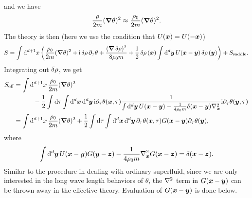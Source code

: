 \documentclass[hyperref, a4paper]{article}
\newcommand*{\ii}{\mathrm{i}}
\begin{document}
\begin{itemize}
and we have 
\[
    \frac{\rho}{2m} (\grad{\theta})^2 \approx \frac{\rho_0}{2m} (\grad{\theta})^2.
\]
The theory is then (here we use the condition that $U(\vb*{x}) = U(- \vb*{x})$)
\begin{equation}
    S = \int \dd[d+1]{x} \left(
        \frac{\rho_0}{2m} (\grad{\theta})^2 
        + \ii \var{\rho} \partial_\tau \theta  
        + \frac{(\grad{\var{\rho}})^2}{8 \rho_0 m} 
        + \frac{1}{2} \var{\rho}(\vb*{x}) \int \dd[d]{\vb*{y}} U(\vb*{x} - \vb*{y}) \var{\rho}(\vb*{y})
    \right) + S_{\text{saddle}}.
\end{equation}
Integrating out $\var{\rho}$, we get 
\begin{equation}
    \begin{aligned}
        S_{\text{eff}} &= \int \dd[d+1]{x} \frac{\rho_0}{2m} (\grad{\theta})^2  \\
        &\quad \quad \quad - \frac{1}{2} \int \dd{\tau} \int \dd[d]{\vb*{x}} \dd[d]{\vb*{y}} 
        \ii \partial_\tau \theta(\vb*{x}, \tau)
            \frac{1}{
                \int \dd[d]{\vb*{y}} U(\vb*{x} - \vb*{y}) 
                - \frac{1}{4 \rho_0 m} \delta(\vb*{x} - \vb*{y}) \laplacian_{\vb*{x}}
            } \ii \partial_\tau \theta (\vb*{y}, \tau) \\
        &= \int \dd[d+1]{x} \frac{\rho_0}{2m} (\grad{\theta})^2 + 
        \frac{1}{2} \int \dd{\tau} \int \dd[d]{\vb*{x}} \dd[d]{\vb*{y}}
        \partial_\tau \theta(\vb*{x}, \tau) G(\vb*{x} - \vb*{y}) \partial_\tau \theta(\vb*{y}),
    \end{aligned}
    \label{eq:eft-theta}
\end{equation}
where 
\begin{equation}
    \int \dd[d]{\vb*{y}} U(\vb*{x} - \vb*{y}) G(\vb*{y} - \vb*{z}) 
    - \frac{1}{4 \rho_0 m} \laplacian_{\vb*{x}} G(\vb*{x} - \vb*{z})  = \delta(\vb*{x} - \vb*{z}).
    \label{eq:g-def}
\end{equation}
Similar to the procedure in dealing with ordinary superfluid,
since we are only interested in the long wave length behaviors of $\theta$,
the $\laplacian$ term in $G(\vb*{x} - \vb*{y})$ can be thrown away in the effective theory.
Evaluation of $G(\vb*{x} - \vb*{y})$ is done below.


\end{itemize}
\end{document}
